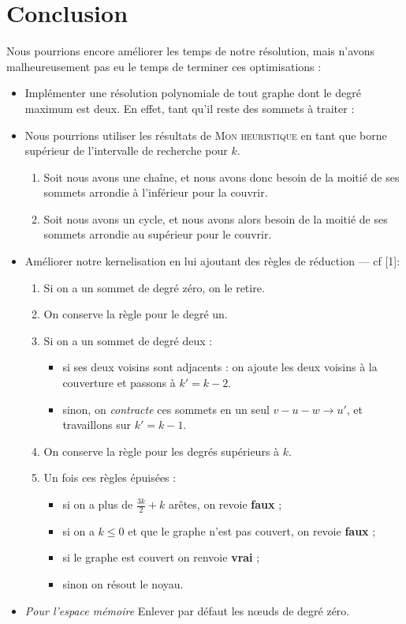 \documentclass[a4paper,10pt,twoside]{report}
\begin{document}
\chapter{Conclusion}
Nous pourrions encore améliorer les temps de notre résolution, mais n'avons malheureusement pas eu le temps de terminer ces optimisations :
\begin{itemize}
    \item Implémenter une résolution polynomiale de tout graphe dont le degré maximum est deux. En effet, tant qu'il reste des sommets à traiter :
    \item Nous pourrions utiliser les résultats de \textsc{Mon heuristique} en tant que borne supérieur de l'intervalle de recherche pour $k$.
    \begin{enumerate}
        \item Soit nous avons une chaîne, et nous avons donc besoin de la moitié de ses sommets arrondie à l'inférieur pour la couvrir.
        \item Soit nous avons un cycle, et nous avons alors besoin de la moitié de ses sommets arrondie au supérieur pour le couvrir.
    \end{enumerate}
    \item Améliorer notre kernelisation en lui ajoutant des règles de réduction --- cf [1]:
    \begin{enumerate}
        \item Si on a un sommet de degré zéro, on le retire.
        \item On conserve la règle pour le degré un.
        \item Si on a un sommet de degré deux :
        \begin{itemize}
            \item si ses deux voisins sont adjacents : on ajoute les deux voisins à la couverture et passons à $k' = k - 2$.
            \item sinon, on \textit{contracte} ces sommets en un seul $v-u-w \rightarrow u'$, et travaillons sur $k' = k - 1$.
        \end{itemize}
        \item On conserve la règle pour les degrés supérieurs à $k$.
        \item Un fois ces règles épuisées :
        \begin{itemize} 
            \item si on a plus de $\frac{3k}{2} + k$ arêtes, on revoie \textbf{faux} ;
            \item si on a $k \leq 0$ et que le graphe n'est pas couvert, on revoie \textbf{faux} ;
            \item si le graphe est couvert on renvoie \textbf{vrai} ;
            \item sinon on résout le noyau.
        \end{itemize}
    \end{enumerate}
    \item \textit{Pour l'espace mémoire} Enlever par défaut les n\oe{}uds de degré zéro.
\end{itemize}
   
\end{document}
